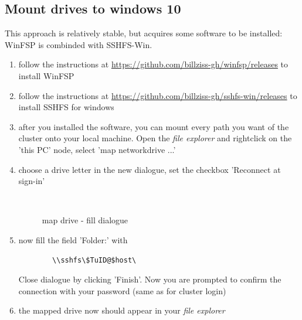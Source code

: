 \documentclass[11pt,twoside,a4paper]{fdyartcl}
\begin{document}
\subsection{Mount drives to windows 10}
\label{sec:mountonwindows}
This approach is relatively stable, but acquires some software to be installed: WinFSP is combinded with SSHFS-Win.

\begin{enumerate}
	\item follow the instructions at \url{https://github.com/billziss-gh/winfsp/releases} to install WinFSP
	\item follow the instructions at \url{https://github.com/billziss-gh/sshfs-win/releases} to install SSHFS for windows
	\item after you installed the software, you can mount every path you want of the cluster onto your local machine.
	Open the \emph{file explorer} and rightclick on the 'this PC' node, select 'map networkdrive ...'
	\item choose a drive letter in the new dialogue, set the checkbox 'Reconnect at sign-in'
		\begin{figure}[htbp] %
		\begin{centering}
		\\
		\end{centering}
		\caption{map drive - fill dialogue}\label{fig:map_drive_dia}
		\end{figure} %
	\item now fill the field 'Folder:' with
	\begin{verbatim}
		\\sshfs\$TuID@$host\
	\end{verbatim}
	Close dialogue by clicking 'Finish'. Now you are prompted to confirm the connection with your password (same as for cluster login)
	\item the mapped drive now should appear in your \emph{file explorer}
\end{enumerate}
\end{document}
